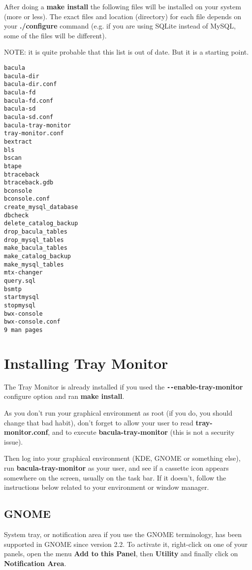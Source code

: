 After doing a {\bf make install} the following files will be installed on your
system (more or less). The exact files and location (directory) for each file
depends on your {\bf ./configure} command (e.g. if you are using SQLite instead
of MySQL, some of the files will be different).

NOTE: it is quite probable that this list is out of date.  But it is a
starting point.

\footnotesize
\begin{verbatim}
bacula
bacula-dir
bacula-dir.conf
bacula-fd
bacula-fd.conf
bacula-sd
bacula-sd.conf
bacula-tray-monitor
tray-monitor.conf
bextract
bls
bscan
btape
btraceback
btraceback.gdb
bconsole
bconsole.conf
create_mysql_database
dbcheck
delete_catalog_backup
drop_bacula_tables
drop_mysql_tables
make_bacula_tables
make_catalog_backup
make_mysql_tables
mtx-changer
query.sql
bsmtp
startmysql
stopmysql
bwx-console
bwx-console.conf
9 man pages
\end{verbatim}
\normalsize

\label{monitor}

\section{Installing Tray Monitor}

The Tray Monitor is already installed if you used the {\bf
\verb:--:enable-tray-monitor} configure option and ran {\bf make install}.

As you don't run your graphical environment as root (if you do, you should
change that bad habit), don't forget to allow your user to read {\bf
tray-monitor.conf}, and to execute {\bf bacula-tray-monitor} (this is not a
security issue).

Then log into your graphical environment (KDE, GNOME or something else), run
{\bf bacula-tray-monitor} as your user, and see if a cassette icon appears
somewhere on the screen, usually on the task bar.
If it doesn't, follow the instructions below related to your environment or
window manager. 

\subsection{GNOME}

System tray, or notification area if you use the GNOME terminology, has been
supported in GNOME since version 2.2. To activate it, right-click on one of
your panels, open the menu {\bf Add to this Panel}, then {\bf Utility} and
finally click on {\bf Notification Area}. 

